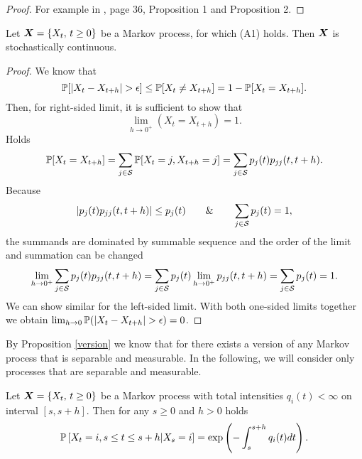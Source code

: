 {	\begin{proof}
		For example in \cite{Mandl85}, page 36, Proposition 1 and Proposition 2.
	\end{proof}

\begin{proposition} %
	Let $\procX$ be a Markov process, for which (A1) holds. Then $\m{X}$ is stochastically continuous.
\end{proposition}

\begin{proof}
	We know that
	\[
		\pr [ \vert X_t - X_{t+h} \vert > \epsilon ] \leq \pr [X_t \neq X_{t+h}] = 1 - \pr [X_t = X_{t+h}].
	\]
	Then, for right-sided limit, it is sufficient to show that
	\[
		\lim_{h \to 0^{+}} (X_t = X_{t+h}) = 1.
	\]
	Holds
	\[
		\pr [X_t = X_{t+h}] = \sum_{j \in \S} \pr [X_t = j, X_{t+h} = j] = \sum_{j \in \S} p_j (t) p_{jj} (t, t+h).
	\]
	Because
	\[
		\vert p_j (t) p_{jj} (t, t+h) \vert \leq p_j (t)
		\qquad \& \qquad
		\sum_{j \in \S} p_j (t) = 1,
	\]
	the summands are dominated by summable sequence and the order of the limit and summation can be changed
	\[
		\lim_{h \to 0^{+}} \sum_{j \in \S} p_j (t) p_{jj} (t, t+h) = \sum_{j \in \S} p_j (t) \lim_{h \to 0^{+}} p_{jj} (t, t+h) = \sum_{j \in \S} p_j (t) = 1.
	\]
	We can show similar for the left-sided limit. With both one-sided limits together we obtain $\lim_{h \to 0} \pr ( \vert X_t - X_{t+h} \vert > \epsilon ) = 0$.
\end{proof}

By Proposition \ref{version} we know that for there exists a version of any Markov process that is separable and measurable. In the following, we will consider only processes that are separable and measurable.

\begin{proposition} %
	Let $\procX$ be a Markov process with total intensities $q_i (t) < \infty$ on interval $[s, s+h]$. Then for any $s \geq 0$ and $h > 0$ holds
	\begin{equation}
		\label{eq:stayProb}
		\pr \left[ X_t = i, s \leq t \leq s+h \vert X_s = i \right]
		= \exp \left(- \int_{s}^{s+h} q_i(t) dt \right).
	\end{equation}
\end{proposition}

}
